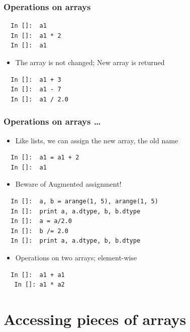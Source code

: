 \begin{frame}[fragile]
  \frametitle{Operations on arrays}
  \begin{lstlisting}
  In []:  a1
  In []:  a1 * 2
  In []:  a1
  \end{lstlisting}
  \begin{itemize}
  \item The array is not changed; New array is returned
  \end{itemize}
  \begin{lstlisting}
  In []:  a1 + 3
  In []:  a1 - 7
  In []:  a1 / 2.0
  \end{lstlisting}
\end{frame}

\begin{frame}[fragile]
  \frametitle{Operations on arrays \ldots}
  \begin{itemize}
  \item Like lists, we can assign the new array, the old name
  \end{itemize}
  \begin{lstlisting}
  In []:  a1 = a1 + 2
  In []:  a1
  \end{lstlisting}
  \begin{itemize}
   \item \alert{Beware of Augmented assignment!}
  \end{itemize}
  \begin{lstlisting}
  In []:  a, b = arange(1, 5), arange(1, 5)
  In []:  print a, a.dtype, b, b.dtype
  In []:  a = a/2.0
  In []:  b /= 2.0
  In []:  print a, a.dtype, b, b.dtype
  \end{lstlisting}
  \begin{itemize}
  \item Operations on two arrays; element-wise
  \end{itemize}
  \begin{lstlisting}
  In []:  a1 + a1
   In []: a1 * a2
  \end{lstlisting}
\end{frame}

\section{Accessing pieces of arrays}

